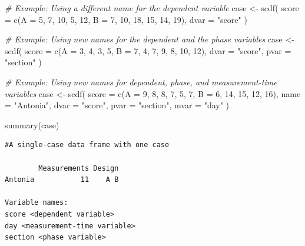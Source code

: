 \documentclass[
]{book}
\newenvironment{Shaded}{\begin{snugshade}}{\end{snugshade}}
\newcommand{\AttributeTok}[1]{\textcolor[rgb]{0.77,0.63,0.00}{#1}}
\newcommand{\CommentTok}[1]{\textcolor[rgb]{0.56,0.35,0.01}{\textit{#1}}}
\newcommand{\DecValTok}[1]{\textcolor[rgb]{0.00,0.00,0.81}{#1}}
\newcommand{\FunctionTok}[1]{\textcolor[rgb]{0.00,0.00,0.00}{#1}}
\newcommand{\NormalTok}[1]{#1}
\newcommand{\OtherTok}[1]{\textcolor[rgb]{0.56,0.35,0.01}{#1}}
\newcommand{\StringTok}[1]{\textcolor[rgb]{0.31,0.60,0.02}{#1}}
\begin{document}
\begin{Shaded}
\begin{Highlighting}[]
\CommentTok{\# Example: Using a different name for the dependent variable}
\NormalTok{case }\OtherTok{\textless{}{-}} \FunctionTok{scdf}\NormalTok{(}
  \AttributeTok{score =} \FunctionTok{c}\NormalTok{(}\AttributeTok{A =} \DecValTok{5}\NormalTok{, }\DecValTok{7}\NormalTok{, }\DecValTok{10}\NormalTok{, }\DecValTok{5}\NormalTok{, }\DecValTok{12}\NormalTok{, }\AttributeTok{B =} \DecValTok{7}\NormalTok{, }\DecValTok{10}\NormalTok{, }\DecValTok{18}\NormalTok{, }\DecValTok{15}\NormalTok{, }\DecValTok{14}\NormalTok{, }\DecValTok{19}\NormalTok{), }
  \AttributeTok{dvar =} \StringTok{"score"}
\NormalTok{)}

\CommentTok{\# Example: Using new names for the dependent and the phase variables}
\NormalTok{case }\OtherTok{\textless{}{-}} \FunctionTok{scdf}\NormalTok{(}
  \AttributeTok{score =} \FunctionTok{c}\NormalTok{(}\AttributeTok{A =} \DecValTok{3}\NormalTok{, }\DecValTok{4}\NormalTok{, }\DecValTok{3}\NormalTok{, }\DecValTok{5}\NormalTok{, }\AttributeTok{B =} \DecValTok{7}\NormalTok{, }\DecValTok{4}\NormalTok{, }\DecValTok{7}\NormalTok{, }\DecValTok{9}\NormalTok{, }\DecValTok{8}\NormalTok{, }\DecValTok{10}\NormalTok{, }\DecValTok{12}\NormalTok{), }
  \AttributeTok{dvar =} \StringTok{"score"}\NormalTok{, }\AttributeTok{pvar =} \StringTok{"section"}
\NormalTok{)}

\CommentTok{\# Example: Using new names for dependent, phase, and measurement{-}time variables}
\NormalTok{case }\OtherTok{\textless{}{-}} \FunctionTok{scdf}\NormalTok{(}
  \AttributeTok{score =} \FunctionTok{c}\NormalTok{(}\AttributeTok{A =} \DecValTok{9}\NormalTok{, }\DecValTok{8}\NormalTok{, }\DecValTok{8}\NormalTok{, }\DecValTok{7}\NormalTok{, }\DecValTok{5}\NormalTok{, }\DecValTok{7}\NormalTok{, }\AttributeTok{B =} \DecValTok{6}\NormalTok{, }\DecValTok{14}\NormalTok{, }\DecValTok{15}\NormalTok{, }\DecValTok{12}\NormalTok{, }\DecValTok{16}\NormalTok{), }
  \AttributeTok{name =} \StringTok{"Antonia"}\NormalTok{, }\AttributeTok{dvar =} \StringTok{"score"}\NormalTok{, }\AttributeTok{pvar =} \StringTok{"section"}\NormalTok{, }\AttributeTok{mvar =} \StringTok{"day"}
\NormalTok{)}

\FunctionTok{summary}\NormalTok{(case)}
\end{Highlighting}
\end{Shaded}

\begin{verbatim}
#A single-case data frame with one case

        Measurements Design
Antonia           11    A B

Variable names:
score <dependent variable>
day <measurement-time variable>
section <phase variable>
\end{verbatim}
\end{document}
